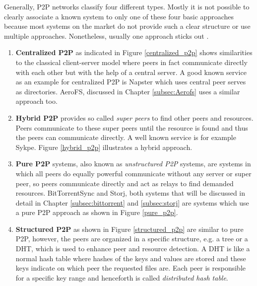 Generally, P2P networks classify four different types. Mostly it is not possible to clearly associate a known system to only one of these four basic approaches because most systems on the market do not provide such a clear structure or use multiple approaches. Nonetheless, usually one approach sticks out \cite{p2p-introduction:tomp2p}. %
\begin{enumerate}
	\item \textbf{Centralized P2P} as indicated in Figure \ref{centralized_p2p} shows similarities to the classical client-server model where peers in fact communicate directly with each other but with the help of a central server. A good known service as an example for centralized P2P is Napster which uses central peer serves as directories. AeroFS, discussed in Chapter \ref{subsec:Aerofs} uses a similar approach too.

	\item \textbf{Hybrid P2P} provides so called \textit{super peers} to find other peers and resources. Peers communicate to these super peers until the resource is found and thus the peers can communicate directly. A well known service is for example Sykpe. Figure \ref{hybrid_p2p} illustrates a hybrid approach.
	
	\item \textbf{Pure P2P} systems, also known as \textit{unstructured P2P} systems, are systems in which all peers do equally powerful communicate without any server or super peer, so peers communicate directly and act as relays to find demanded resources. BitTorrentSync and Storj, both systems that will be discussed in detail in Chapter \ref{subsec:bittorrent} and \ref{subsec:storj} are systems which use a pure P2P approach as shown in Figure \ref{pure_p2p}.
	
	\item \textbf{Structured P2P} as shown in Figure \ref{structured_p2p} are similar to pure P2P, however, the peers are organized in a specific structure, e.g. a tree or a DHT, which is used to enhance peer and resource detection. A DHT is like a normal hash table where hashes of the keys and values are stored and these keys indicate on which peer the requested files are. Each peer is responsible for a specific key range and henceforth is called \textit{distributed hash table}.
\end{enumerate}

